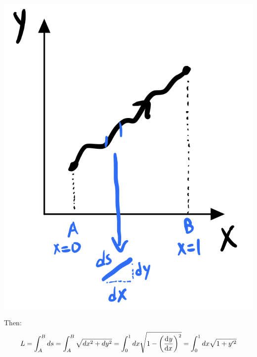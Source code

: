 \begin{center}
    \includegraphics[scale=0.35]{Lectures/Images/lec3-lineelement.png}
\end{center}

Then:
\begin{equation}
    L = \int_A^B ds = \int_A^B \sqrt{dx^2 + dy^2} = \int_0^1 dx \sqrt{1 - \left(\dod[]{y}{x}\right)^2} = \int_0^1 dx\sqrt{1 + y'^2}
\end{equation}

